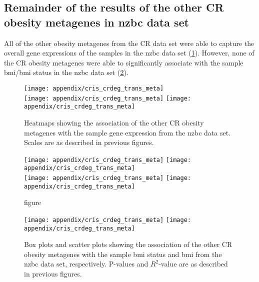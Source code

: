 \begin{appendices}
	\newpage

	\section{Remainder of the results of the other CR obesity metagenes in \gls{nzbc} data set}
	\label{sec:rest_of_the_cr_ob_meta_heatmap_results_cris}

	All of the other obesity metagenes from the CR data set were able to capture the overall gene expressions of the samples in the \gls{nzbc} data set (\cref{fig:appendix/cr_ob_meta_heatmap_cris}).
	However, none of the CR obesity metagenes were able to significantly associate with the sample \gls{bmi}/\gls{bmi} status in the \gls{nzbc} data set (\cref{fig:appendix/cr_ob_meta_box_scatter_cris}).

	\begin{figure}[htp!]
		\centering
		\texttt{[image: appendix/cris\_crdeg\_trans\_meta]}\\
		\vspace{1em}
		\texttt{[image: appendix/cris\_crdeg\_trans\_meta]}
		\hfill
		\texttt{[image: appendix/cris\_crdeg\_trans\_meta]}\\
		\caption{Heatmaps showing the association of the other CR obesity metagenes with the sample gene expression from the \gls{nzbc} data set.
	Scales are as described in previous figures.}
		\label{fig:appendix/cr_ob_meta_heatmap_cris}
	\end{figure}

	\begin{figure}[htpb]
		\ContinuedFloat
		\captionsetup{list=off,format=cont}
		\centering
		\texttt{[image: appendix/cris\_crdeg\_trans\_meta]}
		\hfill
		\texttt{[image: appendix/cris\_crdeg\_trans\_meta]}\\
		\texttt{[image: appendix/cris\_crdeg\_trans\_meta]}
		\hfill
		\texttt{[image: appendix/cris\_crdeg\_trans\_meta]}\\
		\caption{figure}
	\end{figure}

	\begin{figure}[htpb]
		\centering
		\texttt{[image: appendix/cris\_crdeg\_trans\_meta]}
		\hfill
		\texttt{[image: appendix/cris\_crdeg\_trans\_meta]}\\
		\caption{Box plots and scatter plots showing the association of the other CR obesity metagenes with the sample \gls{bmi} status  and \gls{bmi} from the \gls{nzbc} data set, respectively.
	P-values and $R^2$-value are as described in previous figures.}
		\label{fig:appendix/cr_ob_meta_box_scatter_cris}
	\end{figure}


\end{appendices}
